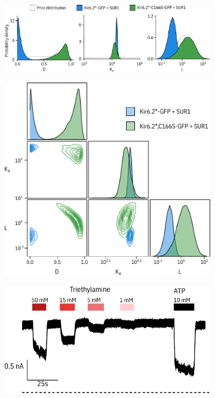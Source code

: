 \begin{figure}[h]
	\centering
	\begin{subfigure}[t]{0.9\textwidth}
		\caption{}\label{ch5fig:c166s_mwc_params_1}
		\centering
		\includegraphics[width=\textwidth]{mwc_c166s_2.pdf}
	\end{subfigure}
	\vfill
	\begin{subfigure}[t]{0.45\textwidth}
		\caption{}\label{ch5fig:c166s_mwc_params_2}
		\centering
		\includegraphics[width=\textwidth]{mwc_c166s_3.pdf}
	\end{subfigure}
	\hfill
	\begin{subfigure}[t]{0.45\textwidth}
		\caption{}\label{ch5fig:tea_trace}
		\centering
		\includegraphics[width=\textwidth]{tea_trace.pdf}

\end{subfigure}
\end{figure}
